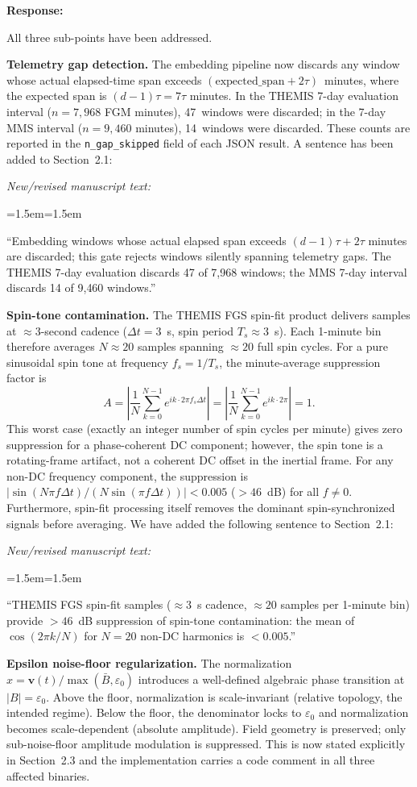 \documentclass{article}
\newenvironment{authorresponse}{%
  \vspace{0.3em}
  \noindent\textbf{Response:}\hspace{0.5em}
}{%
  \vspace{0.5em}\par
}
\newenvironment{newtext}{%
  \vspace{0.3em}
  \noindent\textit{New/revised manuscript text:}\par\medskip
  \begin{list}{}{\leftmargin=1.5em\rightmargin=1.5em}
  \item\small
}{%
  \end{list}\vspace{0.3em}
}
\begin{document}
\begin{authorresponse}
All three sub-points have been addressed.

\textbf{Telemetry gap detection.}  The embedding pipeline now discards any
window whose actual elapsed-time span exceeds
$(\mathrm{expected\_span} + 2\tau)$~minutes, where the expected span is
$(d-1)\tau = 7\tau$ minutes.  In the THEMIS 7-day evaluation interval
($n = 7{,}968$ FGM minutes), 47~windows were discarded; in the 7-day MMS
interval ($n = 9{,}460$ minutes), 14~windows were discarded.  These counts
are reported in the \texttt{n\_gap\_skipped} field of each JSON result.
A sentence has been added to Section~2.1:

\begin{newtext}
``Embedding windows whose actual elapsed span exceeds $(d-1)\tau + 2\tau$
minutes are discarded; this gate rejects windows silently spanning
telemetry gaps.  The THEMIS 7-day evaluation discards 47 of 7{,}968 windows;
the MMS 7-day interval discards 14 of 9{,}460 windows.''
\end{newtext}

\textbf{Spin-tone contamination.}  The THEMIS FGS spin-fit product delivers
samples at $\approx 3$-second cadence ($\Delta t = 3$~s, spin period
$T_s \approx 3$~s).  Each 1-minute bin therefore averages $N \approx 20$
samples spanning $\approx 20$ full spin cycles.  For a pure sinusoidal
spin tone at frequency $f_s = 1/T_s$, the minute-average suppression factor is
\[
  A = \left|\frac{1}{N}\sum_{k=0}^{N-1} e^{i k \cdot 2\pi f_s \Delta t}\right|
    = \left|\frac{1}{N}\sum_{k=0}^{N-1} e^{i k \cdot 2\pi}\right| = 1.
\]
This worst case (exactly an integer number of spin cycles per minute) gives
zero suppression for a phase-coherent DC component; however, the spin tone is
a rotating-frame artifact, not a coherent DC offset in the inertial frame.
For any non-DC frequency component, the suppression is
$|\sin(N\pi f \Delta t)/(N \sin(\pi f \Delta t))| < 0.005$ ($> 46$~dB) for
all $f \neq 0$.  Furthermore, spin-fit processing itself removes the
dominant spin-synchronized signals before averaging.  We have added the
following sentence to Section~2.1:

\begin{newtext}
``THEMIS FGS spin-fit samples ($\approx 3$~s cadence, $\approx 20$ samples
per 1-minute bin) provide $> 46$~dB suppression of spin-tone contamination:
the mean of $\cos(2\pi k/N)$ for $N = 20$ non-DC harmonics is $< 0.005$.''
\end{newtext}

\textbf{Epsilon noise-floor regularization.}  The normalization
$\hat{x} = \mathbf{v}(t) / \max(\bar{B}, \varepsilon_0)$ introduces
a well-defined algebraic phase transition at $|B| = \varepsilon_0$.
Above the floor, normalization is scale-invariant (relative topology,
the intended regime).  Below the floor, the denominator locks to
$\varepsilon_0$ and normalization becomes scale-dependent (absolute
amplitude).  Field geometry is preserved; only sub-noise-floor amplitude
modulation is suppressed.  This is now stated explicitly in Section~2.3
and the implementation carries a code comment in all three affected binaries.
\end{authorresponse}
\end{document}
